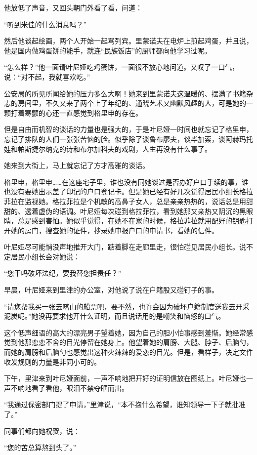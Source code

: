 他放低了声音，又回头朝门外看了看，问道：

“听到米佳的什么消息吗？”

然后他谈起绘画，两个人开始一起骂列宾。里蒙诺夫在电炉上煎起鸡蛋，并且说，他是国内做鸡蛋饼的能手，就连“民族饭店”的厨师都向他学习过呢。

“怎么样？”他一面请叶尼娅吃鸡蛋饼，一面很不放心地问道。又叹了一口气，说：“对不起，我就喜欢吃。”

公安局的所见所闻给她的压力多么大啊！她来到里蒙诺夫这温暖的、摆满了书籍杂志的房间里，不久又来了两个上了年纪的、通晓艺术又幽默风趣的人，可是她的一颗打着寒颤的心还一直感觉到格里申的存在。

但是自由而机智的谈话的力量也是强大的，于是叶尼娅一时间也就忘记了格里申，忘记了排队的人们一张张苦恼的脸。似乎除了谈鲁布廖夫，谈毕加索，谈阿赫玛托娃和帕斯捷尔纳克的诗和布尔加科夫的戏剧，人生再没有什么事了。

她来到大街上，马上就忘记了方才高雅的谈话。

格里申，格里申……在这座宅子里，谁也没有同她谈过是否办好户口手续的事，谁也没有要她出示盖了印记的户口登记卡。但是她已经有好几次觉得居民小组长格拉菲拉在监视她。格拉菲拉是个机敏的高鼻子女人，总是亲亲热热的，说话总是用甜甜的、透着虚伪的语调。叶尼娅每次碰到格拉菲拉，看到她那又亲热又阴沉的黑眼睛，总是感到害怕。她似乎觉得，在她不在家的时候，格拉菲拉就用配好的钥匙打开她的房门，搜查她的证件，抄录她申报户口的申请书，看她的信件。

叶尼娅尽可能悄没声地推开大门，踮着脚在走廊里走，很怕碰见居民小组长。说不定居民小组长会对她说：

“您干吗破坏法纪，要我替您担责任？”

早晨，叶尼娅来到里津的办公室，对他说了说在户籍股又碰钉子的事。

“请您帮我买一张去喀山的船票吧，要不然，也许会因为破坏户籍制度送我去开采泥炭呢。”她没再要求他开什么证明，而且说话用的是嘲笑和恼怒的口气。

这个低声细语的高大的漂亮男子望着她，因为自己的胆小怕事感到羞惭。她经常感觉到他那恋恋不舍的目光停留在她身上。他望着她的肩膀、大腿、脖子、后脑勺，而她的肩膀和后脑勺也感觉出这种火辣辣的爱恋的目光。但是，看样子，决定文件收发规则的力量是非同小可的。

下午，里津来到叶尼娅面前，一声不响地把开好的证明信放在图纸上。叶尼娅也一声不响地看了看他，眼泪不禁夺眶而出。

“我通过保密部门提了申请，”里津说，“本不抱什么希望，谁知领导一下子就批准了。”

同事们都向她祝贺，说：

“您的苦总算熬到头了。”

